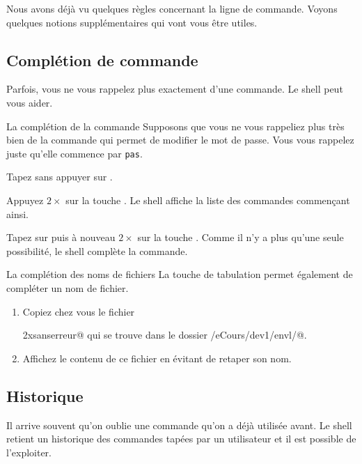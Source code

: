 \documentclass[a4paper,11pt]{style-esi/td}
\begin{document}
	Nous avons déjà vu quelques règles concernant la ligne de commande.
	Voyons quelques notions supplémentaires qui vont vous être utiles.

	\subsection{Complétion de commande}

		Parfois, vous ne vous rappelez plus exactement d'une commande.
		Le shell peut vous aider.  

		\begin{Experience}{La complétion de la commande} 
			Supposons que vous ne vous rappeliez plus très bien 
			de la commande qui permet de modifier le mot de passe.
			Vous vous rappelez juste qu'elle commence par \verb|pas|.
			\begin{steps}
			\item 
				Tapez  sans appuyer sur .
			\item 
				Appuyez $2\times$ sur la touche .
				Le shell affiche la liste des commandes commençant ainsi.
			\item 
				Tapez sur  puis à nouveau $2\times$ sur la touche .
				Comme il n'y a plus qu'une seule possibilité, le shell complète la commande.
			\end{steps}  
		\end{Experience}		

		\begin{Exercice}{La complétion des noms de fichiers} 
			La touche de tabulation permet également de compléter un nom de fichier. 
			\begin{enumerate}
  			\item Copiez chez vous le fichier\par
	  			\verb@monfichieraunomtellementlongquilmeparaitpeuprobabledeletaper2xsanserreur@ 
	  			qui se trouve dans le dossier \verb@/eCours/dev1/envl/@.
			\item Affichez le contenu de ce fichier en évitant de retaper son nom.
			\end{enumerate}
		\end{Exercice}	

	\subsection{Historique}

		Il arrive souvent qu'on oublie une commande qu'on a déjà utilisée avant.
		Le shell retient un historique des commandes tapées par un utilisateur
		et il est possible de l'exploiter.
		
\end{document}
